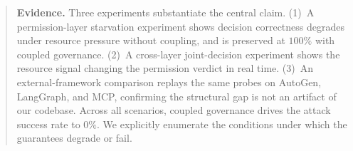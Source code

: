 \documentclass[10pt,letterpaper]{article}
\begin{document}
\begin{abstract}
\textbf{Evidence.} Three experiments substantiate the central claim.
(1)~A permission-layer starvation experiment shows decision correctness
degrades under resource pressure without coupling, and is preserved at
$100\%$ with coupled governance. (2)~A cross-layer joint-decision
experiment shows the resource signal changing the permission verdict in
real time. (3)~An external-framework comparison replays the same
probes on AutoGen, LangGraph, and MCP, confirming the structural gap is
not an artifact of our codebase. Across all scenarios, coupled
governance drives the attack success rate to $0\%$. We explicitly
enumerate the conditions under which the guarantees degrade or fail.
\end{abstract}














\end{document}
